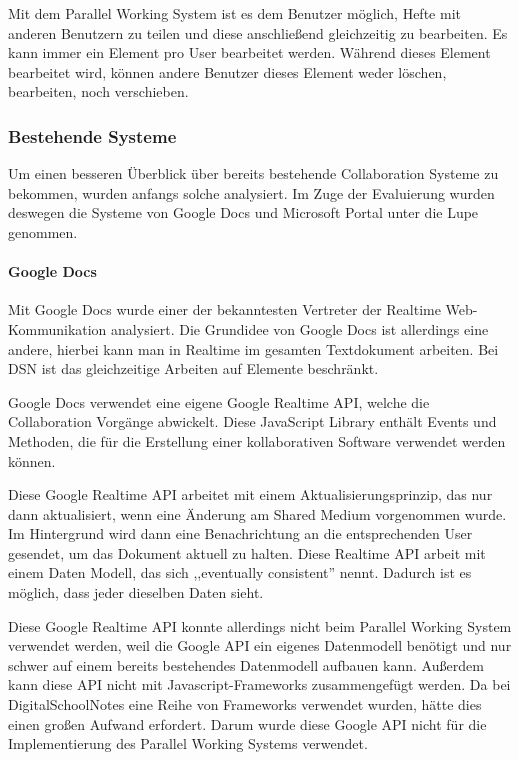 Mit dem Parallel Working System ist es dem Benutzer möglich, Hefte mit anderen Benutzern zu teilen und diese anschließend gleichzeitig zu bearbeiten. Es kann immer ein Element pro User bearbeitet werden. Während dieses Element bearbeitet wird, können andere Benutzer dieses Element weder löschen, bearbeiten, noch verschieben. 
\subsubsection{Bestehende Systeme}
Um einen besseren Überblick über bereits bestehende Collaboration Systeme zu bekommen, wurden anfangs solche analysiert. Im Zuge der Evaluierung wurden deswegen die Systeme von Google Docs und Microsoft Portal unter die Lupe genommen.
\paragraph{Google Docs}
Mit Google Docs wurde einer der bekanntesten Vertreter der Realtime Web-Kommunikation analysiert. Die Grundidee von Google Docs ist allerdings eine andere, hierbei kann man in Realtime im gesamten Textdokument arbeiten. Bei DSN ist das gleichzeitige Arbeiten auf Elemente beschränkt.

Google Docs verwendet eine eigene Google Realtime API, welche die Collaboration Vorgänge abwickelt. Diese JavaScript Library enthält Events und Methoden, die für die Erstellung einer kollaborativen Software verwendet werden können.

Diese Google Realtime API arbeitet mit einem Aktualisierungsprinzip, das nur dann aktualisiert, wenn eine Änderung am Shared Medium vorgenommen wurde. Im Hintergrund wird dann eine Benachrichtung an die entsprechenden User gesendet, um das Dokument aktuell zu halten. Diese Realtime API arbeit mit einem Daten Modell, das sich ,,eventually consistent'' nennt. Dadurch ist es möglich, dass jeder dieselben Daten sieht.\cite{GOOGLE}

Diese Google Realtime API konnte allerdings nicht beim Parallel Working System verwendet werden, weil die Google API ein eigenes Datenmodell benötigt und nur schwer auf einem bereits bestehendes Datenmodell aufbauen kann. Außerdem kann diese API nicht mit Javascript-Frameworks zusammengefügt werden. Da bei DigitalSchoolNotes eine Reihe von Frameworks verwendet wurden, hätte dies einen großen Aufwand erfordert. Darum wurde diese Google API nicht für die Implementierung des Parallel Working Systems verwendet.

